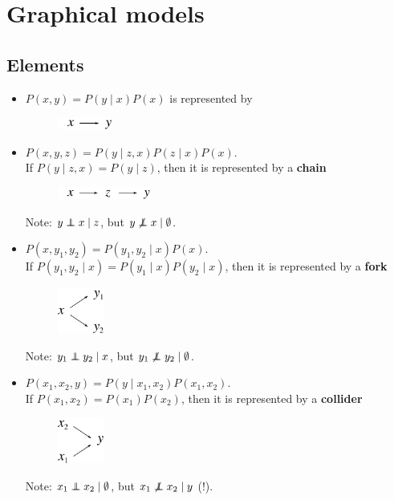 \newpage
\section{Graphical models}


\subsection{Elements}
\begin{itemize}
	\item $P(x, y) = P(y\;|\;x) P(x)$ is represented by 
	\begin{figure}[h]
	\centering
		\includegraphics[height=4mm]{./figs/04-xy.pdf} 
	\end{figure}

	\item $P(x, y, z) = P(y\;|\;z,x) P(z\;|\;x) P(x)$. \\ 
	 If $P(y\;|\;z,x) = P(y\;|\;z)$, then it is represented by a {\bf chain}

	\begin{figure}[h]
	\centering
		\includegraphics[height=4mm]{./figs/04-xzy.pdf} 
	\end{figure}

	Note: $y \independent x \;|\;z$, but $y \not\independent x\; | \; \emptyset$.

	\item $P(x, y_1, y_2) = P(y_1, y_2\;|\;x) P(x)$. \\
	If $P(y_1, y_2 \;|\; x) = P(y_1\;|\;x) P(y_2\;|\;x)$, then it is represented by a {\bf fork}

	\begin{figure}[h]
	\centering
		\includegraphics[height=15mm]{./figs/04-xy1y2.pdf} 
	\end{figure}

	Note: $y_1 \independent y_2 \;|\;x$, but $y_1 \not\independent y_2\; | \; \emptyset$.

	\item $P(x_1, x_2, y) = P(y\;|\;x_1, x_2) P(x_1, x_2)$. \\
	If $P(x_1, x_2) = P(x_1) P(x_2)$, then it is represented by a {\bf collider}

	\begin{figure}[h!]
	\centering
		\includegraphics[height=15mm]{./figs/04-x1x2y.pdf} 
	\end{figure}

	Note: $x_1 \independent x_2\;|\;\emptyset$, but $x_1 \not\independent x_2\;|\;y$ (!).
	
\end{itemize}

